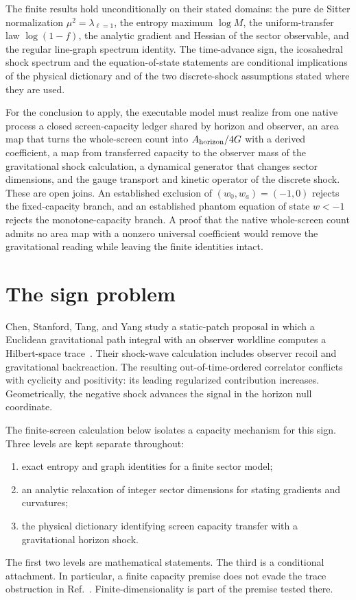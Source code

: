 \documentclass[11pt]{article}
\theoremstyle{remark}
\begin{document}
The finite results hold unconditionally on their stated domains: the pure
de Sitter normalization \(\mu^2=\lambda_{\ell=1}\), the entropy maximum
\(\log M\), the uniform-transfer law \(\log(1-f)\), the analytic gradient
and Hessian of the sector observable, and the regular line-graph spectrum
identity. The time-advance sign, the icosahedral shock spectrum and the
equation-of-state statements are conditional implications of the physical
dictionary and of the two discrete-shock assumptions stated where they are
used.

For the conclusion to apply, the executable model must realize from one
native process a closed screen-capacity ledger shared by horizon and
observer, an area map that turns the whole-screen count into
\(A_{\rm horizon}/4G\) with a derived coefficient, a map from transferred
capacity to the observer mass of the gravitational shock calculation, a
dynamical generator that changes sector dimensions, and the gauge transport
and kinetic operator of the discrete shock. These are open joins. An
established exclusion of \((w_0,w_a)=(-1,0)\) rejects the fixed-capacity
branch, and an established phantom equation of state \(w<-1\) rejects the
monotone-capacity branch. A proof that the native whole-screen count admits
no area map with a nonzero universal coefficient would remove the
gravitational reading while leaving the finite identities intact.

\section{The sign problem}

Chen, Stanford, Tang, and Yang study a static-patch proposal in which a
Euclidean gravitational path integral with an observer worldline computes a
Hilbert-space trace~\cite{chenStanfordTangYang2026}. Their shock-wave
calculation includes observer recoil and gravitational backreaction. The
resulting out-of-time-ordered correlator conflicts with cyclicity and
positivity: its leading regularized contribution increases. Geometrically,
the negative shock advances the signal in the horizon null coordinate.

The finite-screen calculation below isolates a capacity mechanism for this
sign. Three levels are kept separate throughout:
\begin{enumerate}
\item exact entropy and graph identities for a finite sector model;
\item an analytic relaxation of integer sector dimensions for stating
gradients and curvatures;
\item the physical dictionary identifying screen capacity transfer with a
gravitational horizon shock.
\end{enumerate}
The first two levels are mathematical statements. The third is a conditional
attachment. In particular, a finite capacity premise does not evade the trace
obstruction in Ref.~\cite{chenStanfordTangYang2026}. Finite-dimensionality is
part of the premise tested there.
\end{document}
